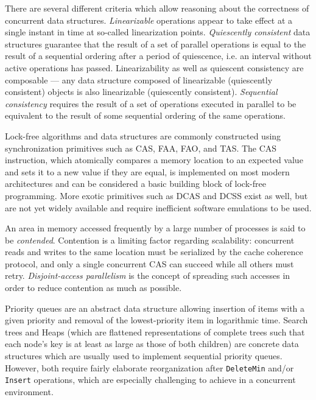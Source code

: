 \documentclass[a4paper,10pt]{article}
\begin{document}
There are several different criteria which allow reasoning about the correctness of concurrent
data structures. \emph{Linearizable} \cite{herlihy1990linearizability} operations appear to take
effect at a single instant in time at so-called linearization points.
\emph{Quiescently consistent} \cite{shavit1996diffracting} data structures
guarantee that the result of a set of parallel operations is equal to the result of a sequential ordering
after a period of quiescence, i.e. an interval without active operations has passed.
Linearizability as well as quiescent consistency are composable ---
any data structure composed of linearizable (quiescently consistent) objects is also linearizable
(quiescently consistent).
\emph{Sequential consistency} \cite{lamport1979make} requires the result of a set of operations
executed in parallel to be equivalent to the result of some sequential ordering of the same
operations.



Lock-free algorithms and data structures are commonly constructed using synchronization primitives
such as \acf{CAS}, \ac{FAA}, \ac{FAO}, and \ac{TAS}. The \ac{CAS} instruction, which atomically
compares a memory location to an expected value and sets it to a new value if they are equal,
is implemented on most modern architectures and can be considered a basic building block of lock-free
programming. More exotic primitives such as \ac{DCAS} and \ac{DCSS} exist as well, but are not yet
widely available and require inefficient software emulations to be used.



An area in memory accessed frequently by a large number of processes is said to be \emph{contended}.
Contention is a limiting factor regarding scalability: concurrent reads and writes to the same
location must be serialized by the cache coherence protocol, and only a single concurrent \ac{CAS}
can succeed while all others must retry. \emph{Disjoint-access parallelism} is the concept of
spreading such accesses in order to reduce contention as much as possible.



Priority queues are an abstract data structure allowing insertion of items with a given priority
and removal of the lowest-priority item in logarithmic time. Search trees and Heaps (which are
flattened representations of complete trees such that each node's key is at least as large as
those of both children) are concrete data structures which are usually used to implement sequential
priority queues. However, both require fairly elaborate reorganization after
{\lstset{breakatwhitespace=true} \lstinline|DeleteMin|}
and/or \lstinline|Insert| operations, which are especially challenging to achieve in a concurrent
environment.
\end{document}
